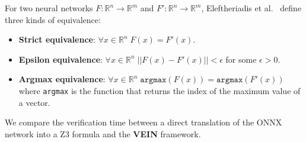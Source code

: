 For two neural networks $F: \mathbb{R}^n \to \mathbb{R}^m$ and $F': \mathbb{R}^n \to \mathbb{R}^m$, Eleftheriadis et
al.~\cite{eleftheriadis2022equivalence} define three kinds of equivalence:
\begin{itemize}
	\item \textbf{Strict equivalence}: $\forall x \in \mathbb{R}^n \; F(x) = F'(x)$.
	\item \textbf{Epsilon equivalence}: $\forall x \in \mathbb{R}^n \; ||F(x) - F'(x)|| < \epsilon$ for some $\epsilon > 0$.
	\item \textbf{Argmax equivalence}: $\forall x \in \mathbb{R}^n \; \mathtt{argmax}(F(x))=\mathtt{argmax}(F'(x))$ where \texttt{argmax}
		is the function that returns the index of the maximum value of a vector.
\end{itemize}

We compare the verification time between a direct translation of the ONNX network into a Z3 formula
and the \textbf{VEIN} framework.

